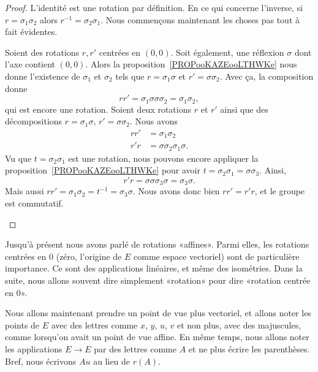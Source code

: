 \begin{proof}
	L'identité est une rotation par définition. En ce qui concerne l'inverse, si \( r=\sigma_1\sigma_2\) alors \( r^{-1}=\sigma_2\sigma_1\). Nous commençons maintenant les choses pas tout à fait évidentes.
	\begin{subproof}
		\spitem[Composition]
		Soient des rotations \( r,r'\) centrées en \( (0,0)\). Soit également, une réflexion \( \sigma\) dont l'axe contient \( (0,0)\). Alors la proposition~\ref{PROPooKAZEooLTHWKe} nous donne l'existence de \( \sigma_1\) et \( \sigma_2\) tels que \( r=\sigma_1\sigma\) et \( r'=\sigma\sigma_2\). Avec ça, la composition donne
		\begin{equation}
			rr'=\sigma_1\sigma\sigma\sigma_2=\sigma_1\sigma_2,
		\end{equation}
		qui est encore une rotation.
		\spitem[Commutativité]
		Soient deux rotations \( r\) et \( r'\) ainsi que des décompositions \( r=\sigma_1\sigma\), \( r'=\sigma\sigma_2\). Nous avons
		\begin{subequations}
			\begin{align}
				rr' & =\sigma_1\sigma_2              \\
				r'r & =\sigma\sigma_2\sigma_1\sigma.
			\end{align}
		\end{subequations}
		Vu que \( t=\sigma_2\sigma_1\) est une rotation, nous pouvons encore appliquer la proposition~\ref{PROPooKAZEooLTHWKe} pour avoir \( t=\sigma_2\sigma_1=\sigma\sigma_3\). Ainsi,
		\begin{equation}
			r'r=\sigma\sigma\sigma_3\sigma=\sigma_3\sigma.
		\end{equation}
		Mais aussi \( rr'=\sigma_1\sigma_2=t^{-1}=\sigma_3\sigma\). Nous avons donc bien \( rr'=r'r\), et le groupe est commutatif.
	\end{subproof}
\end{proof}

\begin{normaltext}      \label{NORMooOUDJooRfbDEX}
	Jusqu'à présent nous avons parlé de rotations «affines». Parmi elles, les rotations centrées en \( 0\) (zéro, l'origine de \( E\) comme espace vectoriel) sont de particulière importance. Ce sont des applications linéaires, et même des isométries. Dans la suite, nous allons souvent dire simplement «rotation» pour dire «rotation centrée en \( 0\)».

	Nous allons maintenant prendre un point de vue plus vectoriel, et allons noter les points de \( E\) avec des lettres comme \( x\), \( y\), \( u\), \( v\) et non plus, avec des majuscules, comme lorsqu'on avait un point de vue affine. En même temps, nous allons noter les applications \( E\to E \) par des lettres comme \( A\) et ne plus écrire les parenthèses. Bref, nous écrivons \( Au\) au lieu de \( r(A)\).
\end{normaltext}

